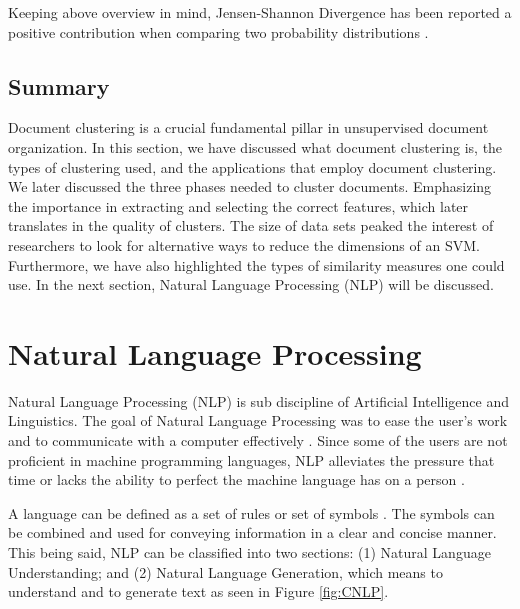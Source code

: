 Keeping above overview in mind, Jensen-Shannon Divergence has been reported a positive contribution when comparing two probability distributions \cite{Uto2017,9358561}. 

\subsection{Summary}
Document clustering is a crucial fundamental pillar in unsupervised document organization. In this section, we have discussed what document clustering is, the types of clustering used, and the applications that employ document clustering. We later discussed the three phases needed to cluster documents. Emphasizing the importance in extracting and selecting the correct features, which later translates in the quality of clusters. The size of data sets peaked the interest of researchers to look for alternative ways to reduce the dimensions of an SVM. Furthermore, we have also highlighted the types of similarity measures one could use. In the next section, Natural Language Processing (NLP) will be discussed.

\section{Natural Language Processing} \label{secc:LDAover}

Natural Language Processing (NLP) is sub discipline of Artificial Intelligence and Linguistics. The goal of Natural Language Processing was to ease the user's work and to communicate with a computer effectively \cite{khurana2017natural}. Since some of the users are not proficient in machine programming languages, NLP alleviates the pressure that time or lacks the ability to perfect the machine language has on a person \cite{russell2016artificial}. 

A language can be defined as a set of rules or set of symbols \cite{santana2016language}. The symbols can be combined and used for conveying information in a clear and concise manner. This being said, NLP can be classified into two sections: (1) Natural Language Understanding; and (2) Natural Language Generation, which means to understand and to generate text as seen in Figure \ref{fig:CNLP}.

